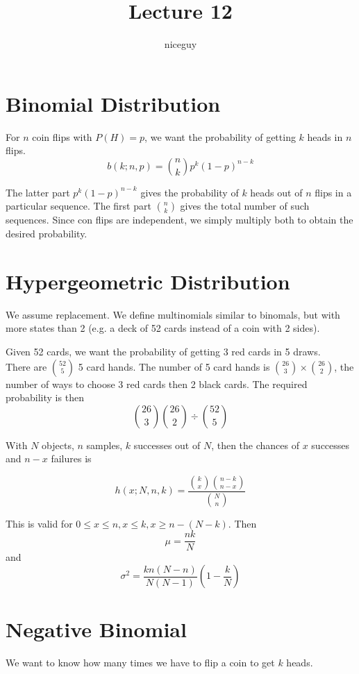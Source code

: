 \documentclass[12pt]{article}
\author{niceguy}
\title{Lecture 12}
\begin{document}
\maketitle

\section{Binomial Distribution}

For $n$ coin flips with $P(H) = p$, we want the probability of getting $k$ heads in $n$ flips.
$$b(k;n,p) = \binom{n}{k}p^k(1-p)^{n-k}$$

The latter part $p^k(1-p)^{n-k}$ gives the probability of $k$ heads out of $n$ flips in a particular sequence. The first part $\binom{n}{k}$ gives the total number of such sequences. Since con flips are independent, we simply multiply both to obtain the desired probability.

\section{Hypergeometric Distribution}

We assume replacement. We define multinomials similar to binomals, but with more states than 2 (e.g. a deck of 52 cards instead of a coin with 2 sides).

\begin{ex}
	Given 52 cards, we want the probability of getting 3 red cards in 5 draws. \\
	There are $\binom{52}{5}$ 5 card hands. The number of 5 card hands is $\binom{26}{3}\times\binom{26}{2}$, the number of ways to choose 3 red cards then 2 black cards. The required probability is then
	$$\binom{26}{3}\binom{26}{2}\div\binom{52}{5}$$
\end{ex}

With $N$ objects, $n$ samples, $k$ successes out of $N$, then the chances of $x$ successes and $n-x$ failures is

$$h(x;N,n,k) = \frac{\binom{k}{x}\binom{n-k}{n-x}}{\binom{N}{n}}$$

This is valid for $0\leq x \leq n, x \leq k, x \geq n-(N-k)$. Then
$$\mu = \frac{nk}{N}$$
and
$$\sigma^2 = \frac{kn(N-n)}{N(N-1)}\left(1-\frac{k}{N}\right)$$

\section{Negative Binomial}

We want to know how many times we have to flip a coin to get $k$ heads.
\end{document}
